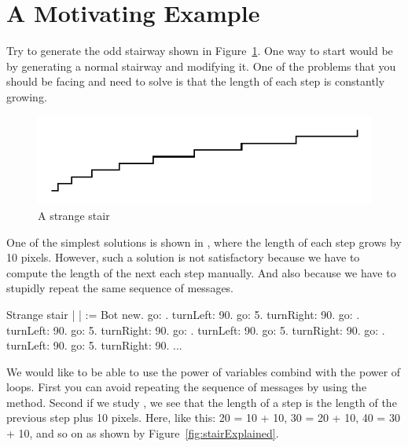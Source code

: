 
\section{A Motivating Example}

Try to generate the odd stairway shown in Figure~\ref{fig:strangestair}. One way to start would be by generating a normal stairway and modifying it. One of the problems  that you should be facing and need to solve is that the length of each step is constantly growing.

\begin{figure}[!htbp]
\centerline{\includegraphics[width=12cm]{varLoopsFlatStair}}
\caption{A strange stair}
\label{fig:strangestair}
\end{figure}

One of the simplest solutions is shown in , where the length of each step grows by 10 pixels. However, such a solution is not satisfactory because we have to compute  the length of the next each step manually. And also because we have to stupidly repeat the same sequence of messages.

\begin{scriptwithtitle}{Strange stair}\label{src:strange1}
| \caro |
\caro := Bot new.
\caro go: .
\caro turnLeft: 90.
\caro go: 5. 
\caro turnRight: 90.
\caro go: .
\caro turnLeft: 90.
\caro go: 5. 
\caro turnRight: 90.
\caro go: .
\caro turnLeft: 90.
\caro go: 5. 
\caro turnRight: 90.
\caro go: .
\caro turnLeft: 90.
\caro go: 5. 
\caro turnRight: 90.
...
\end{scriptwithtitle}

We would like to be able to use the power of variables combind with the power of loops. First you can avoid repeating  the sequence of messages by using the \timesRepeat method.  Second if we study , we see that the length of a step is the length of the previous step plus 10 pixels. Here, like this: 20 = 10 + 10, 30 = 20 + 10, 40 = 30 + 10, and so on as shown by Figure~\ref{fig:stairExplained}.

